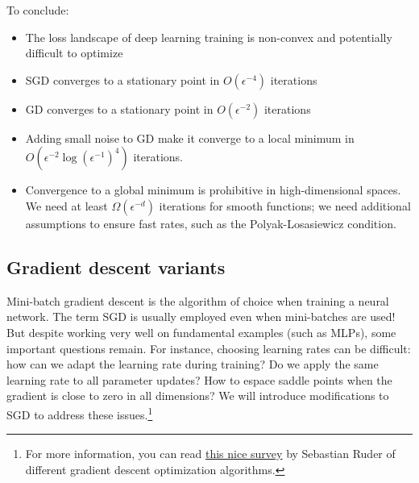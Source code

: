 To conclude:
\begin{itemize}
    \item The loss landscape of deep learning training is non-convex and potentially difficult to optimize
    \item SGD converges to a stationary point in $O(\epsilon^{-4})$ iterations
    \item GD converges to a stationary point in $O(\epsilon^{-2})$ iterations
    \item Adding small noise to GD make it converge to a local minimum in $O(\epsilon^{-2}\log(\epsilon^{-1})^4)$ iterations.
    \item Convergence to a global minimum is prohibitive in high-dimensional spaces. We need at least $\Omega(\epsilon^{-d})$ iterations for smooth functions; we need additional assumptions to ensure fast rates, such as the Polyak-Losasiewicz condition.
\end{itemize}

\subsection{Gradient descent variants}
Mini-batch gradient descent is the algorithm of choice when training a neural network. The term SGD is usually employed even when mini-batches are used! But despite working very well on fundamental examples (such as MLPs), some important questions remain. For instance, choosing learning rates can be difficult: how can we adapt the learning rate during training? Do we apply the same learning rate to all parameter updates? How to espace saddle points when the gradient is close to zero in all dimensions? We will introduce modifications to SGD to address these issues.\footnote{For more information, you can read \href{https://www.ruder.io/optimizing-gradient-descent/}{this nice survey} by Sebastian Ruder of different gradient descent optimization algorithms.}

